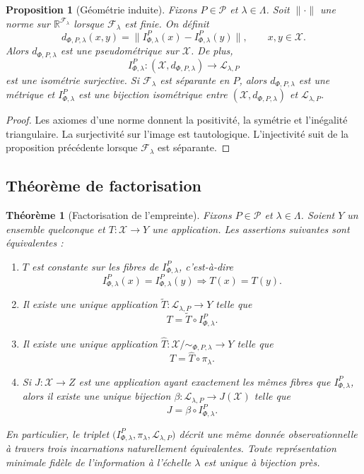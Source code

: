 \documentclass[11pt,a4paper,openany]{book}
\newtheorem{proposition}[definition]{Proposition}
\newtheorem{theorem}[definition]{Théorème}
\begin{document}
\begin{proposition}[Géométrie induite]
Fixons \(P\in\mathcal P\) et \(\lambda\in\Lambda\). Soit \(\|\cdot\|\) une norme sur \(\mathbb R^{\mathcal F_\lambda}\) lorsque \(\mathcal F_\lambda\) est finie. On définit
\[
d_{\Phi,P,\lambda}(x,y)=\|I_{\Phi,\lambda}^P(x)-I_{\Phi,\lambda}^P(y)\|,
\qquad x,y\in\mathcal X.
\]
Alors \(d_{\Phi,P,\lambda}\) est une pseudométrique sur \(\mathcal X\). De plus,
\[
I_{\Phi,\lambda}^P:(\mathcal X,d_{\Phi,P,\lambda})\longrightarrow \mathcal L_{\lambda,P}
\]
est une isométrie surjective. Si \(\mathcal F_\lambda\) est séparante en \(P\), alors \(d_{\Phi,P,\lambda}\) est une métrique et \(I_{\Phi,\lambda}^P\) est une bijection isométrique entre \((\mathcal X,d_{\Phi,P,\lambda})\) et \(\mathcal L_{\lambda,P}\).
\end{proposition}

\begin{proof}
Les axiomes d'une norme donnent la positivité, la symétrie et l'inégalité triangulaire. La surjectivité sur l'image est tautologique. L'injectivité suit de la proposition précédente lorsque \(\mathcal F_\lambda\) est séparante.
\end{proof}

\subsection{Théorème de factorisation}

\begin{theorem}[Factorisation de l'empreinte]
Fixons \(P\in\mathcal P\) et \(\lambda\in\Lambda\). Soient \(Y\) un ensemble quelconque et \(T:\mathcal X\to Y\) une application. Les assertions suivantes sont équivalentes :
\begin{enumerate}[label=\textbf{(\arabic*)}]
\item \(T\) est constante sur les fibres de \(I_{\Phi,\lambda}^P\), c'est-à-dire
\[
I_{\Phi,\lambda}^P(x)=I_{\Phi,\lambda}^P(y)\Longrightarrow T(x)=T(y).
\]
\item Il existe une unique application \(\widetilde T:\mathcal L_{\lambda,P}\to Y\) telle que
\[
T=\widetilde T\circ I_{\Phi,\lambda}^P.
\]
\item Il existe une unique application \(\widehat T:\mathcal X/{\sim_{\Phi,P,\lambda}}\to Y\) telle que
\[
T=\widehat T\circ \pi_\lambda.
\]
\item Si \(J:\mathcal X\to Z\) est une application ayant exactement les mêmes fibres que \(I_{\Phi,\lambda}^P\), alors il existe une unique bijection \(\beta:\mathcal L_{\lambda,P}\to J(\mathcal X)\) telle que
\[
J=\beta\circ I_{\Phi,\lambda}^P.
\]
\end{enumerate}

En particulier, le triplet \(\bigl(I_{\Phi,\lambda}^P,\pi_\lambda,\mathcal L_{\lambda,P}\bigr)\) décrit une même donnée observationnelle à travers trois incarnations naturellement équivalentes. Toute représentation minimale fidèle de l'information à l'échelle \(\lambda\) est unique à bijection près.
\end{theorem}
\end{document}
